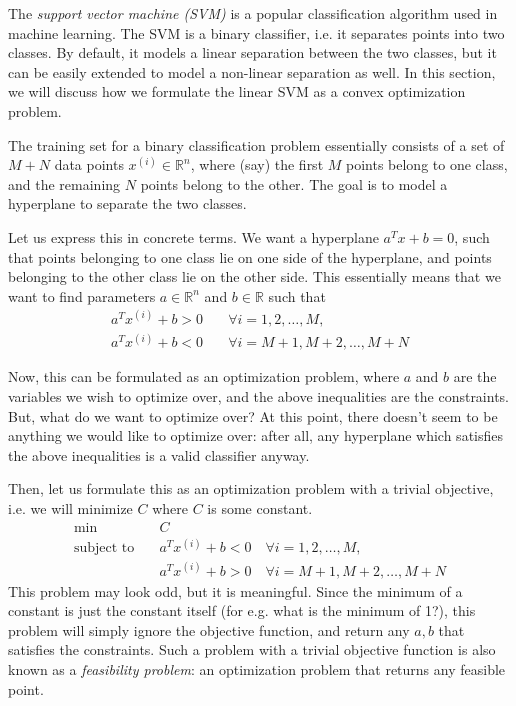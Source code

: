 \documentclass[a4paper]{article}
\theoremstyle{definition}
\begin{document}
The \textit{support vector machine (SVM)} is a popular classification algorithm used in machine learning.
The SVM is a binary classifier, i.e. it separates points into two classes.
By default, it models a linear separation between the two classes, but it can be easily extended to model a non-linear separation as well.
In this section, we will discuss how we formulate the linear SVM as a convex optimization problem.

The training set for a binary classification problem essentially consists of a set of $M + N$ data points $x^{(i)} \in \mathbb{R}^n$, where (say) the first $M$ points belong to one class, and the remaining $N$ points belong to the other.
The goal is to model a hyperplane to separate the two classes.

Let us express this in concrete terms.
We want a hyperplane $a^T x + b = 0$, such that points belonging to one class lie on one side of the hyperplane, and points belonging to the other class lie on the other side.
This essentially means that we want to find parameters $a \in \mathbb{R}^n$ and $b \in \mathbb{R}$ such that
\begin{align*}
	a^T x^{(i)} + b > 0 \quad & \forall i = 1, 2, \dots, M, \\
	a^T x^{(i)} + b < 0 \quad & \forall i = M{+}1, M{+}2, \dots, M{+}N
\end{align*}

Now, this can be formulated as an optimization problem, where $a$ and $b$ are the variables we wish to optimize over, and the above inequalities are the constraints.
But, what do we want to optimize over?
At this point, there doesn't seem to be anything we would like to optimize over: after all, any hyperplane which satisfies the above inequalities is a valid classifier anyway.

Then, let us formulate this as an optimization problem with a trivial objective, i.e. we will minimize $C$ where $C$ is some constant.
\begin{align*}
	\min \quad & C \\
	\text{subject to} \quad & a^T x^{(i)} + b < 0 \quad \forall i = 1, 2, \dots, M, \\
	& a^T x^{(i)} + b > 0 \quad \forall i = M{+}1, M{+}2, \dots, M{+}N
\end{align*}
This problem may look odd, but it is meaningful.
Since the minimum of a constant is just the constant itself (for e.g. what is the minimum of 1?), this problem will simply ignore the objective function, and return any $a, b$ that satisfies the constraints.
Such a problem with a trivial objective function is also known as a \textit{feasibility problem}: an optimization problem that returns any feasible point.
\end{document}
